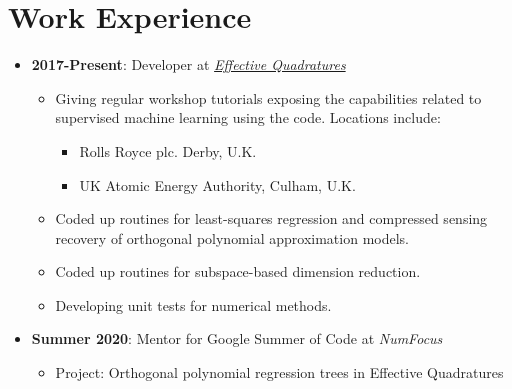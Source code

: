 \documentclass[letterpaper,11pt,oneside]{article}
\begin{document}
\section*{Work Experience}
\begin{itemize}
\item \textbf{2017-Present}: Developer at \href{https://www.effective-quadratures.org/}{\emph{Effective Quadratures}}
\begin{itemize}
\item Giving regular workshop tutorials exposing the capabilities related to supervised machine learning using the code. Locations include:
\begin{itemize}
\item Rolls Royce plc. Derby, U.K.
\item UK Atomic Energy Authority, Culham, U.K.
\end{itemize}
\item Coded up routines for least-squares regression and compressed sensing recovery of orthogonal polynomial approximation models.
\item Coded up routines for subspace-based dimension reduction.
\item Developing unit tests for numerical methods.
\end{itemize}
\item \textbf{Summer 2020}: Mentor for Google Summer of Code at \emph{NumFocus}
\begin{itemize}
\item Project: Orthogonal polynomial regression trees in Effective Quadratures
\end{itemize}


\end{itemize}
\end{document}
